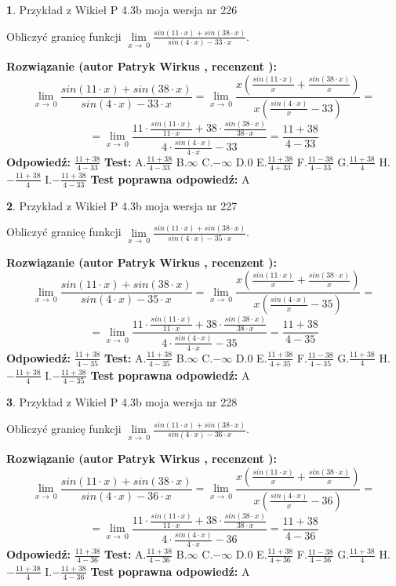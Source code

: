 \documentclass[12pt, a4paper]{article}
\theoremstyle{definition} %
\newtheorem{zad}{}
\newcommand{\zadStart}[1]{\begin{zad}#1\newline}
\newcommand{\zadStop}{\end{zad}}
\newcommand{\rozwStart}[2]{\noindent \textbf{Rozwiązanie (autor #1 , recenzent #2): }\newline}
\newcommand{\rozwStop}{\newline}
\newcommand{\odpStart}{\noindent \textbf{Odpowiedź:}\newline}
\newcommand{\odpStop}{\newline}
\newcommand{\testStart}{\noindent \textbf{Test:}\newline}
\newcommand{\testStop}{\newline}
\newcommand{\kluczStart}{\noindent \textbf{Test poprawna odpowiedź:}\newline}
\newcommand{\kluczStop}{\newline}
\begin{document}
\zadStart{Przykład z Wikieł P 4.3b moja wersja nr 226}


Obliczyć granicę funkcji $\lim\limits_{x\to\ 0}\frac{sin(11 \cdot x)+sin(38 \cdot x)}{sin(4 \cdot x)-33 \cdot x}$.
\zadStop
\rozwStart{Patryk Wirkus}{}
$$\lim\limits_{x\to\ 0}\frac{sin(11 \cdot x)+sin(38 \cdot x)}{sin(4 \cdot x)-33 \cdot x}=\lim\limits_{x\to\ 0}\frac{x(\frac{sin(11 \cdot x)}{x}+\frac{sin(38 \cdot x)}{x})}{x(\frac{sin(4 \cdot x)}{x}-33)}=$$
$$=\lim\limits_{x\to\ 0}\frac{11 \cdot \frac{sin(11 \cdot x)}{11 \cdot x}+38 \cdot \frac{sin(38 \cdot x)}{38 \cdot x}}{4 \cdot \frac{sin(4 \cdot x)}{4 \cdot x}-33}=\frac{11+38}{4-33}$$
\rozwStop
\odpStart
$\frac{11+38}{4-33}$
\odpStop
\testStart
A.$\frac{11+38}{4-33}$
B.$\infty$
C.$-\infty$
D.$0$
E.$\frac{11+38}{4+33}$
F.$\frac{11-38}{4-33}$
G.$\frac{11+38}{4}$
H.$-\frac{11+38}{4}$
I.$-\frac{11+38}{4-33}$
\testStop
\kluczStart
A
\kluczStop



\zadStart{Przykład z Wikieł P 4.3b moja wersja nr 227}


Obliczyć granicę funkcji $\lim\limits_{x\to\ 0}\frac{sin(11 \cdot x)+sin(38 \cdot x)}{sin(4 \cdot x)-35 \cdot x}$.
\zadStop
\rozwStart{Patryk Wirkus}{}
$$\lim\limits_{x\to\ 0}\frac{sin(11 \cdot x)+sin(38 \cdot x)}{sin(4 \cdot x)-35 \cdot x}=\lim\limits_{x\to\ 0}\frac{x(\frac{sin(11 \cdot x)}{x}+\frac{sin(38 \cdot x)}{x})}{x(\frac{sin(4 \cdot x)}{x}-35)}=$$
$$=\lim\limits_{x\to\ 0}\frac{11 \cdot \frac{sin(11 \cdot x)}{11 \cdot x}+38 \cdot \frac{sin(38 \cdot x)}{38 \cdot x}}{4 \cdot \frac{sin(4 \cdot x)}{4 \cdot x}-35}=\frac{11+38}{4-35}$$
\rozwStop
\odpStart
$\frac{11+38}{4-35}$
\odpStop
\testStart
A.$\frac{11+38}{4-35}$
B.$\infty$
C.$-\infty$
D.$0$
E.$\frac{11+38}{4+35}$
F.$\frac{11-38}{4-35}$
G.$\frac{11+38}{4}$
H.$-\frac{11+38}{4}$
I.$-\frac{11+38}{4-35}$
\testStop
\kluczStart
A
\kluczStop



\zadStart{Przykład z Wikieł P 4.3b moja wersja nr 228}


Obliczyć granicę funkcji $\lim\limits_{x\to\ 0}\frac{sin(11 \cdot x)+sin(38 \cdot x)}{sin(4 \cdot x)-36 \cdot x}$.
\zadStop
\rozwStart{Patryk Wirkus}{}
$$\lim\limits_{x\to\ 0}\frac{sin(11 \cdot x)+sin(38 \cdot x)}{sin(4 \cdot x)-36 \cdot x}=\lim\limits_{x\to\ 0}\frac{x(\frac{sin(11 \cdot x)}{x}+\frac{sin(38 \cdot x)}{x})}{x(\frac{sin(4 \cdot x)}{x}-36)}=$$
$$=\lim\limits_{x\to\ 0}\frac{11 \cdot \frac{sin(11 \cdot x)}{11 \cdot x}+38 \cdot \frac{sin(38 \cdot x)}{38 \cdot x}}{4 \cdot \frac{sin(4 \cdot x)}{4 \cdot x}-36}=\frac{11+38}{4-36}$$
\rozwStop
\odpStart
$\frac{11+38}{4-36}$
\odpStop
\testStart
A.$\frac{11+38}{4-36}$
B.$\infty$
C.$-\infty$
D.$0$
E.$\frac{11+38}{4+36}$
F.$\frac{11-38}{4-36}$
G.$\frac{11+38}{4}$
H.$-\frac{11+38}{4}$
I.$-\frac{11+38}{4-36}$
\testStop
\kluczStart
A
\kluczStop
\end{document}
